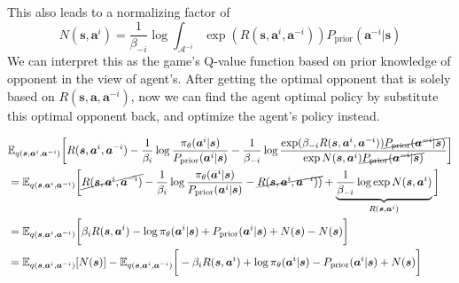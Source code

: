 This also leads to a normalizing factor of 
\begin{equation}
    N(\boldsymbol{s}, \boldsymbol{a}^{i}) = \frac{1}{\beta_{-i} }\log \int_{\mathcal{A}^{-i}} \exp(R(\boldsymbol{s}, \boldsymbol{a}^i, \boldsymbol{a}^{-i}))P_{\text{prior}}(\boldsymbol{a}^{-i} | \boldsymbol{s})
\end{equation}
We can interpret this as the game's Q-value function based on prior knowledge of opponent \cite{grau2018balancing} in the view of agent's. After getting the optimal opponent that is solely based on $R(\boldsymbol{s}, \boldsymbol{a}, \boldsymbol{a}^{-i})$, now we can find the agent optimal policy by substitute this optimal opponent back, and optimize the agent's policy instead.

\begin{equation*}
    \begin{aligned}
        &\mathbb{E}_{q(\boldsymbol{s}, \boldsymbol{a}^i, \boldsymbol{a}^{-i})}\bigg[ R(\boldsymbol{s}, \boldsymbol{a}^i, \boldsymbol{a}^{-i})  - \frac{1}{\beta_{i}}\log \frac{\pi_{\theta}(\boldsymbol{a}^i | \boldsymbol{s})}{P_{\text{prior}}(\boldsymbol{a}^i | \boldsymbol{s})}  - \frac{1}{\beta_{-i}}\log \frac{\exp(\beta_{-i} R(\boldsymbol{s}, \boldsymbol{a}^i, \boldsymbol{a}^{-i}))\cancel{P_{\text{prior}}(\boldsymbol{a}^{-i} | \boldsymbol{s})}}{\exp  N(\boldsymbol{s}, \boldsymbol{a}^{i}) \cancel{P_{\text{prior}}(\boldsymbol{a}^{-i} | \boldsymbol{s})} } \bigg] \\
        &= \mathbb{E}_{q(\boldsymbol{s}, \boldsymbol{a}^i, \boldsymbol{a}^{-i})}\bigg[ \cancel{R(\boldsymbol{s}, \boldsymbol{a}^i, \boldsymbol{a}^{-i})}  - \frac{1}{\beta_{i}}\log \frac{\pi_{\theta}(\boldsymbol{a}^i | \boldsymbol{s})}{P_{\text{prior}}(\boldsymbol{a}^i | \boldsymbol{s})}  - \cancel{R(\boldsymbol{s}, \boldsymbol{a}^i, \boldsymbol{a}^{-i}))} + \underbrace{ \frac{1}{\beta_{-i}}\log \exp N(\boldsymbol{s}, \boldsymbol{a}^{i})}_{R(\boldsymbol{s}, \boldsymbol{a}^i)} \bigg]\\
        &= \mathbb{E}_{q(\boldsymbol{s}, \boldsymbol{a}^i, \boldsymbol{a}^{-i})}\bigg[ \beta_i R(\boldsymbol{s}, \boldsymbol{a}^i) - \log \pi_{\theta}(\boldsymbol{a}^i | \boldsymbol{s}) +  P_{\text{prior}}(\boldsymbol{a}^i | \boldsymbol{s}) + N(\boldsymbol{s}) - N(\boldsymbol{s}) \bigg] \\
        &= \mathbb{E}_{q(\boldsymbol{s}, \boldsymbol{a}^i, \boldsymbol{a}^{-i})}[N(\boldsymbol{s})] - 
        \mathbb{E}_{q(\boldsymbol{s}, \boldsymbol{a}^i, \boldsymbol{a}^{-i})}\bigg[ -\beta_i R(\boldsymbol{s}, \boldsymbol{a}^i) + \log \pi_{\theta}(\boldsymbol{a}^i | \boldsymbol{s}) -  P_{\text{prior}}(\boldsymbol{a}^i | \boldsymbol{s}) + N(\boldsymbol{s}) \bigg] \\

\end{aligned}
\end{equation*}

